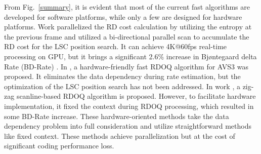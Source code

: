 \documentclass[lettersize,journal]{IEEEtran}
\begin{document}

From Fig.~\ref{summary}, it is evident that most of the current fast algorithms are developed for software platforms, while only a few are designed for hardware platforms. Work \cite{igarashi2018parallelGPU} parallelized the RD cost calculation by utilizing the entropy at the previous frame and utilized a bi-directional parallel scan to accumulate the RD cost for the LSC position search. It can achieve 4K@60fps real-time processing on GPU, but it brings a significant 2.6\% increase in Bjøntegaard delta Rate (BD-Rate) \cite{bjontegaard2001calculationofPSNR}. In \cite{xu2022hardwarefriendlyforrdoq}, a hardware-friendly fast RDOQ algorithm for AVS3 was proposed. It eliminates the data dependency during rate estimation, but the optimization of the LSC position search has not been addressed. In work \cite{zhao2023scanline}, a zig-zag scanline-based RDOQ algorithm is proposed. However, to facilitate hardware implementation, it fixed the context during RDOQ processing, which resulted in some BD-Rate increase. 
These hardware-oriented methods take the data dependency problem into full consideration and utilize straightforward methods like fixed context. These methods achieve parallelization but at the cost of significant coding performance loss. 
\end{document}
